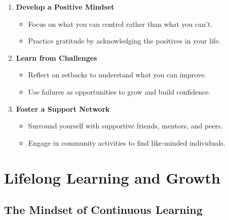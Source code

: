 \documentclass[
  letterpaper,
  DIV=11,
  numbers=noendperiod]{scrreprt}
\providecommand{\tightlist}{%
  \setlength{\itemsep}{0pt}\setlength{\parskip}{0pt}}\usepackage{longtable,booktabs,array}
\begin{document}
\begin{enumerate}
\def\labelenumi{\arabic{enumi}.}
\item
  \textbf{Develop a Positive Mindset}

  \begin{itemize}
  \tightlist
  \item
    Focus on what you can control rather than what you can't.
  \item
    Practice gratitude by acknowledging the positives in your life.
  \end{itemize}
\item
  \textbf{Learn from Challenges}

  \begin{itemize}
  \tightlist
  \item
    Reflect on setbacks to understand what you can improve.
  \item
    Use failures as opportunities to grow and build confidence.
  \end{itemize}
\item
  \textbf{Foster a Support Network}

  \begin{itemize}
  \tightlist
  \item
    Surround yourself with supportive friends, mentors, and peers.
  \item
    Engage in community activities to find like-minded individuals.
  \end{itemize}
\end{enumerate}


\chapter{Lifelong Learning and
Growth}\label{lifelong-learning-and-growth}

\section{The Mindset of Continuous
Learning}\label{the-mindset-of-continuous-learning}
\end{document}
